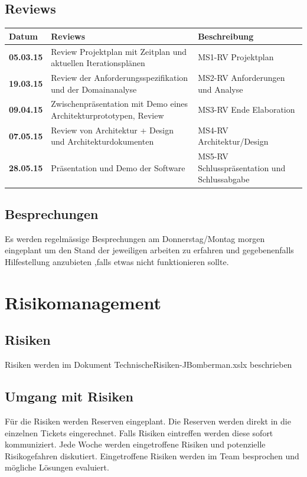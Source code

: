 \documentclass[11pt]{scrartcl}
\begin{document}
\subsection{Reviews}
\label{sec:Reviews}
\begin{table}[h]
\begin{tabularx}{\textwidth}{l X X}
\textbf{Datum} & \textbf{Reviews} & \textbf{Beschreibung} \\
\hline
\textbf{05.03.15} & Review Projektplan mit Zeitplan 
und aktuellen Iterationsplänen & MS1-RV Projektplan \\
\hline
\textbf{19.03.15} & Review der Anforderungsspezifikation
 und der Domainanalyse & MS2-RV Anforderungen 
 und Analyse \\
\hline
\textbf{09.04.15} & Zwischenpräsentation mit Demo eines
Architekturprototypen, Review & MS3-RV 
Ende Elaboration \\
\hline
\textbf{07.05.15} & Review von Architektur + Design
 und Architekturdokumenten & MS4-RV Architektur/Design \\
\hline
\textbf{28.05.15} & Präsentation und Demo der Software
& MS5-RV Schlusspräsentation und Schlussabgabe \\
\hline
\end{tabularx}
\end{table}

\subsection{Besprechungen}
Es werden regelmässige Besprechungen am 
Donnerstag/Montag morgen eingeplant um 
den Stand der jeweiligen arbeiten zu erfahren 
und gegebenenfalls Hilfestellung anzubieten 
,falls etwas nicht funktionieren sollte.

\section{Risikomanagement}
\label{Risikomanagement}
\subsection{Risiken}
\label{sec:Risiken}
Risiken werden im Dokument TechnischeRisiken-JBomberman.xslx beschrieben
\subsection{Umgang mit Risiken}
\label{sec:Umgang mit Risiken}
Für die Risiken werden Reserven eingeplant. Die Reserven werden direkt in die einzelnen Tickets eingerechnet. Falls Risiken eintreffen werden diese sofort kommuniziert. Jede Woche werden eingetroffene Risiken und potenzielle Risikogefahren diskutiert. Eingetroffene Risiken werden im Team besprochen und mögliche Lösungen evaluiert.
\end{document}
